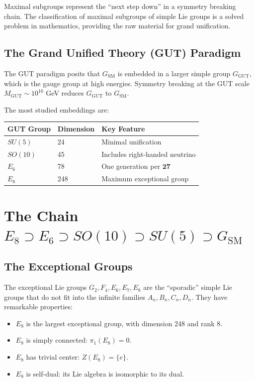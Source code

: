 \documentclass[11pt,a4paper,openright]{book}
\theoremstyle{plain}
\theoremstyle{definition}
\newcommand{\SM}{\mathrm{SM}}
\newcommand{\GUT}{\mathrm{GUT}}
\begin{document}
Maximal subgroups represent the ``next step down'' in a symmetry breaking chain. The classification of maximal subgroups of simple Lie groups is a solved problem in mathematics, providing the raw material for grand unification.

\subsection{The Grand Unified Theory (GUT) Paradigm}

The GUT paradigm posits that $G_{\SM}$ is embedded in a larger simple group $G_{\GUT}$, which is the gauge group at high energies. Symmetry breaking at the GUT scale $M_{\GUT} \sim 10^{16}$ GeV reduces $G_{\GUT}$ to $G_{\SM}$.

The most studied embeddings are:

\begin{center}
\begin{tabular}{lll}
\toprule
\textbf{GUT Group} & \textbf{Dimension} & \textbf{Key Feature} \\
\midrule
$SU(5)$ & 24 & Minimal unification \\
$SO(10)$ & 45 & Includes right-handed neutrino \\
$E_6$ & 78 & One generation per $\mathbf{27}$ \\
$E_8$ & 248 & Maximum exceptional group \\
\bottomrule
\end{tabular}
\end{center}

\section{The Chain $E_8 \supset E_6 \supset SO(10) \supset SU(5) \supset G_{\SM}$}

\subsection{The Exceptional Groups}

The exceptional Lie groups $G_2, F_4, E_6, E_7, E_8$ are the ``sporadic'' simple Lie groups that do not fit into the infinite families $A_n, B_n, C_n, D_n$. They have remarkable properties:

\begin{itemize}
    \item $E_8$ is the largest exceptional group, with dimension 248 and rank 8.
    \item $E_8$ is simply connected: $\pi_1(E_8) = 0$.
    \item $E_8$ has trivial center: $Z(E_8) = \{e\}$.
    \item $E_8$ is self-dual: its Lie algebra is isomorphic to its dual.
\end{itemize}
\end{document}
